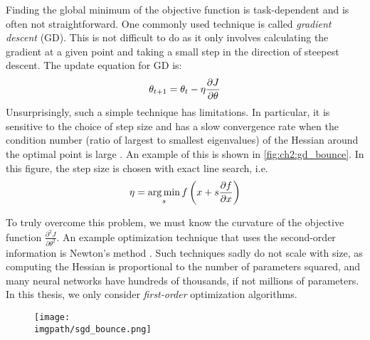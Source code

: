   Finding the global minimum of the objective
  function is task-dependent and is often not straightforward. One commonly used
  technique is called \emph{gradient descent} (GD). This is not difficult to do as
  it only involves calculating the gradient at a given point and taking a small
  step in the direction of steepest descent. The update equation for GD is:
  \begin{equation}\label{eq:ch2:gd}
    \theta_{t+1} = \theta_t - \eta \frac{\partial J}{\partial \theta}
  \end{equation}
  Unsurprisingly, such a simple technique has limitations. In particular, it
  is sensitive to the choice of step size and
  has a slow convergence rate when the condition number (ratio of largest to
  smallest eigenvalues) of the Hessian around the optimal point is large
  \cite{boyd_convex_2004}. An example of this is shown in
  \autoref{fig:ch2:gd_bounce}. In this figure, the step size is chosen with
  exact line search, i.e.
  \begin{equation}\label{eq:ch2:search}
    \eta = \operatorname*{arg\,min}_s f\left(x + s \frac{\partial f}{\partial x}\right)
  \end{equation}

  To truly overcome this problem, we must know the curvature
  of the objective function $\frac{\partial^2 J}{\partial \theta^2}$. An example
  optimization technique that uses the second-order information is Newton's
  method \cite[Chapter~9]{boyd_convex_2004}. Such techniques sadly do not scale
  with size, as computing the Hessian is proportional to the number of
  parameters squared, and many neural networks have hundreds of thousands, if
  not millions of parameters. In this thesis, we only consider
  \emph{first-order} optimization algorithms.

  \begin{figure}[t]
  \centering
  \texttt{[image: \\imgpath/sgd\_bounce.png]}
  \label{fig:ch2:gd_bounce}
\end{figure}

